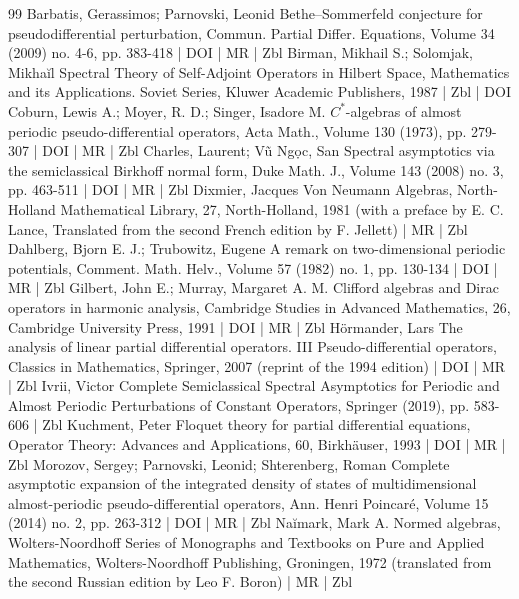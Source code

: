 \documentclass[10pt]{amsart}
\theoremstyle{definition}\newtheorem{defi}[theo]{Definition}\newtheorem{rema}[theo]{Remark}\newtheorem{exam}[theo]{Example}\newtheorem{nota}[theo]{Notation}
\begin{document}
\begin{thebibliography}{99}
Barbatis, Gerassimos; Parnovski, Leonid Bethe–Sommerfeld conjecture for pseudodifferential perturbation, Commun. Partial Differ. Equations, Volume 34 (2009) no. 4-6, pp. 383-418 | DOI | MR | Zbl
Birman, Mikhail S.; Solomjak, Mikhaĭl Spectral Theory of Self-Adjoint Operators in Hilbert Space, Mathematics and its Applications. Soviet Series, Kluwer Academic Publishers, 1987 | Zbl | DOI
Coburn, Lewis A.; Moyer, R. D.; Singer, Isadore M. ${C}^*$-algebras of almost periodic pseudo-differential operators, Acta Math., Volume 130 (1973), pp. 279-307 | DOI | MR | Zbl
Charles, Laurent; Vũ Ngọc, San Spectral asymptotics via the semiclassical Birkhoff normal form, Duke Math. J., Volume 143 (2008) no. 3, pp. 463-511 | DOI | MR | Zbl
Dixmier, Jacques Von Neumann Algebras, North-Holland Mathematical Library, 27, North-Holland, 1981 (with a preface by E. C. Lance, Translated from the second French edition by F. Jellett) | MR | Zbl
Dahlberg, Bjorn E. J.; Trubowitz, Eugene A remark on two-dimensional periodic potentials, Comment. Math. Helv., Volume 57 (1982) no. 1, pp. 130-134 | DOI | MR | Zbl
Gilbert, John E.; Murray, Margaret A. M. Clifford algebras and Dirac operators in harmonic analysis, Cambridge Studies in Advanced Mathematics, 26, Cambridge University Press, 1991 | DOI | MR | Zbl
Hörmander, Lars The analysis of linear partial differential operators. III Pseudo-differential operators, Classics in Mathematics, Springer, 2007 (reprint of the 1994 edition) | DOI | MR | Zbl
Ivrii, Victor Complete Semiclassical Spectral Asymptotics for Periodic and Almost Periodic Perturbations of Constant Operators, Springer (2019), pp. 583-606 | Zbl
Kuchment, Peter Floquet theory for partial differential equations, Operator Theory: Advances and Applications, 60, Birkhäuser, 1993 | DOI | MR | Zbl
Morozov, Sergey; Parnovski, Leonid; Shterenberg, Roman Complete asymptotic expansion of the integrated density of states of multidimensional almost-periodic pseudo-differential operators, Ann. Henri Poincaré, Volume 15 (2014) no. 2, pp. 263-312 | DOI | MR | Zbl
Naĭmark, Mark A. Normed algebras, Wolters-Noordhoff Series of Monographs and Textbooks on Pure and Applied Mathematics, Wolters-Noordhoff Publishing, Groningen, 1972 (translated from the second Russian edition by Leo F. Boron) | MR | Zbl

\end{thebibliography}
\end{document}
